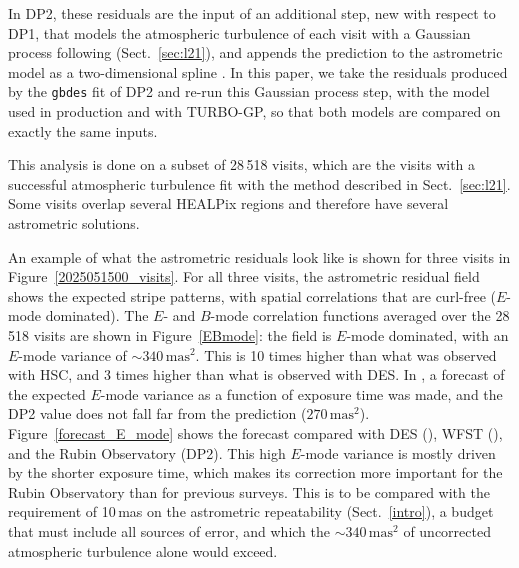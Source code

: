 In DP2, these residuals are the input of an additional step, new with respect to DP1, that models the atmospheric turbulence of 
each visit with a Gaussian process following  (Sect.~\ref{sec:l21}), and appends the prediction to the astrometric model as 
a two-dimensional spline \citep{RTN-115}.
In this paper, we take the residuals produced by the \texttt{gbdes} fit of DP2 and re-run this Gaussian process step, with the 
 model used in production and with TURBO-GP, so that both models are compared on exactly the same inputs.

This analysis is done on a subset of 28\,518 visits, which are the visits with a successful atmospheric turbulence fit with 
the  method described in Sect.~\ref{sec:l21}.
Some visits overlap several HEALPix regions and therefore have several astrometric solutions.

An example of what the astrometric residuals look like is shown for three visits in Figure~\ref{2025051500_visits}.
For all three visits, the astrometric residual field shows the expected stripe patterns, with spatial correlations 
that are curl-free ($E$-mode dominated). The $E$- and $B$-mode correlation functions averaged over the 28\,518 visits 
are shown in Figure~\ref{EBmode}: the field is $E$-mode dominated, with an $E$-mode variance of ${\sim}340\,\mathrm{mas}^2$.
This is 10 times higher than what was observed with HSC, and 3 times higher than what is observed with DES.
In , a forecast of the expected $E$-mode variance as a function of exposure time was made, 
and the DP2 value does not fall far from the  prediction ($270\,\mathrm{mas}^2$).
Figure~\ref{forecast_E_mode} shows the  forecast compared with DES (), 
WFST (), and the Rubin Observatory (DP2).
This high $E$-mode variance is mostly driven by the shorter exposure time, which makes its correction more important for the Rubin Observatory 
than for previous surveys. This is to be compared with the requirement of 10\,mas on the astrometric repeatability (Sect.~\ref{intro}), 
a budget that must include all sources of error, and which the ${\sim}340\,\mathrm{mas}^2$ of uncorrected atmospheric turbulence alone would exceed.

